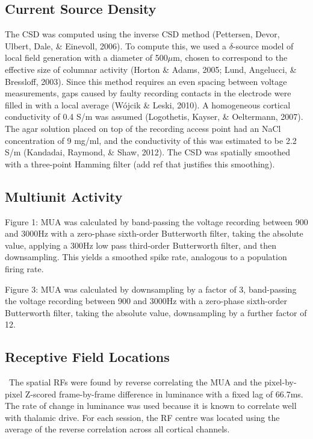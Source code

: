 \subsection[Current Source Density]{Current Source Density}
The \ac{CSD} was computed using the inverse \ac{CSD} method (Pettersen, Devor, Ulbert, Dale, \& Einevoll, 2006). To compute this, we used a $\delta$-source model of local field generation with a diameter of 500$\mu$m, chosen to correspond to the effective size of columnar activity (Horton \& Adams, 2005; Lund, Angelucci, \& Bressloff, 2003). Since this method requires an even spacing between voltage measurements, gaps caused by faulty recording contacts in the electrode were filled in with a local average (W\'ojcik \& Leski, 2010). A homogeneous cortical conductivity of 0.4 S/m was assumed (Logothetis, Kayser, \& Oeltermann, 2007). The agar solution placed on top of the recording access point had an NaCl concentration of 9 mg/ml, and the conductivity of this was estimated to be 2.2 S/m (Kandadai, Raymond, \& Shaw, 2012). The \ac{CSD} was spatially smoothed with a three-point Hamming filter (add ref that justifies this smoothing).

\subsection{Multiunit Activity }
Figure 1: \ac{MUA} was calculated by band-passing the voltage recording between 900 and 3000Hz with a zero-phase sixth-order Butterworth filter, taking the absolute value, applying a 300Hz low pass third-order Butterworth filter, and then downsampling. This yields a smoothed spike rate, analogous to a population firing rate.

Figure 3: \ac{MUA} was calculated by downsampling by a factor of 3, band-passing the voltage recording between 900 and 3000Hz with a zero-phase sixth-order Butterworth filter, taking the absolute value, downsampling by a further factor of 12.

\subsection{Receptive Field Locations}
\ The spatial \acp{RF} were found by reverse correlating the \ac{MUA} and the pixel-by-pixel Z-scored frame-by-frame difference in luminance with a fixed lag of 66.7ms. The rate of change in luminance was used because it is known to correlate well with thalamic drive. For each session, the \ac{RF} centre was located using the average of the reverse correlation across all cortical channels.


